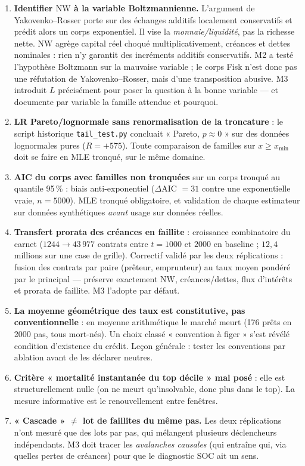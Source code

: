 \documentclass[11pt,a4paper]{article}
\newcommand{\NW}{\mathrm{NW}}
\newcommand{\code}[1]{\texttt{#1}}
\begin{document}
\begin{enumerate}[leftmargin=1.6em, itemsep=3pt]
\item \textbf{Identifier $\NW$ à la variable Boltzmannienne.} L'argument de
  Yakovenko--Rosser porte sur des échanges additifs localement conservatifs
  et prédit alors un corps exponentiel. Il vise la
  \emph{monnaie/liquidité}, pas la richesse nette. $\NW$ agrège capital réel
  choqué multiplicativement, créances et dettes nominales : rien n'y garantit
  des incréments additifs conservatifs. M2 a testé l'hypothèse Boltzmann sur
  la mauvaise variable ; le corps Fisk n'est donc pas une réfutation de
  Yakovenko--Rosser, mais d'une transposition abusive. M3 introduit $L$
  précisément pour poser la question à la bonne variable --- et documente par
  variable la famille attendue et pourquoi.
\item \textbf{LR Pareto/lognormale sans renormalisation de la troncature} :
  le script historique \code{tail\_test.py} concluait
  « Pareto, $p \approx 0$ » sur des données lognormales pures
  ($R = +575$). Toute comparaison de familles sur $x \ge x_{\min}$ doit se
  faire en MLE tronqué, sur le même domaine.
\item \textbf{AIC du corps avec familles non tronquées} sur un corps tronqué
  au quantile 95\,\% : biais anti-exponentiel ($\Delta$AIC $= 31$ contre une
  exponentielle vraie, $n = 5000$). MLE tronqué obligatoire, et validation de
  chaque estimateur sur données synthétiques \emph{avant} usage sur données
  réelles.
\item \textbf{Transfert prorata des créances en faillite} : croissance
  combinatoire du carnet ($1244 \to 43\,977$ contrats entre $t=1000$ et $2000$
  en baseline ; $12{,}4$ millions sur une case de grille). Correctif validé
  par les deux réplications : fusion des contrats par paire
  (prêteur, emprunteur) au taux moyen pondéré par le principal --- préserve
  exactement $\NW$, créances/dettes, flux d'intérêts et prorata de faillite.
  M3 l'adopte par défaut.
\item \textbf{La moyenne géométrique des taux est constitutive, pas
  conventionnelle} : en moyenne arithmétique le marché meurt (176 prêts en
  2000 pas, tous mort-nés). Un choix classé « convention à figer » s'est révélé
  condition d'existence du crédit. Leçon générale : tester les conventions par
  ablation avant de les déclarer neutres.
\item \textbf{Critère « mortalité instantanée du top décile » mal posé} : elle
  est structurellement nulle (on ne meurt qu'insolvable, donc plus dans le
  top). La mesure informative est le renouvellement entre fenêtres.
\item \textbf{« Cascade » $\ne$ lot de faillites du même pas.} Les deux
  réplications n'ont mesuré que des lots par pas, qui mélangent plusieurs
  déclencheurs indépendants. M3 doit tracer les \emph{avalanches causales}
  (qui entraîne qui, via quelles pertes de créances) pour que le diagnostic
  SOC ait un sens.
\end{enumerate}
\end{document}
